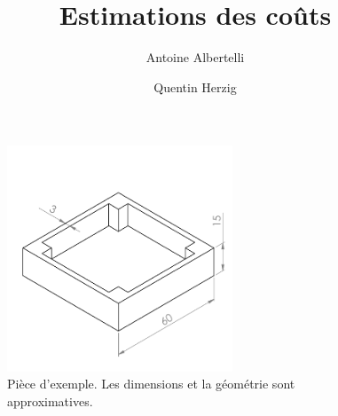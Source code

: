\documentclass[a4paper]{paper}
\title{Estimations des coûts}
\author{Antoine Albertelli \and Quentin Herzig}
\begin{document}
\maketitle



\begin{figure}[h]
    \begin{center}
        \includegraphics[width=0.6\textwidth]{../images/example_part/example_mid}
        \caption{Pièce d'exemple. Les dimensions et la géométrie sont approximatives.}\label{fig:example-part}
    \end{center}
\end{figure}
\end{document}
